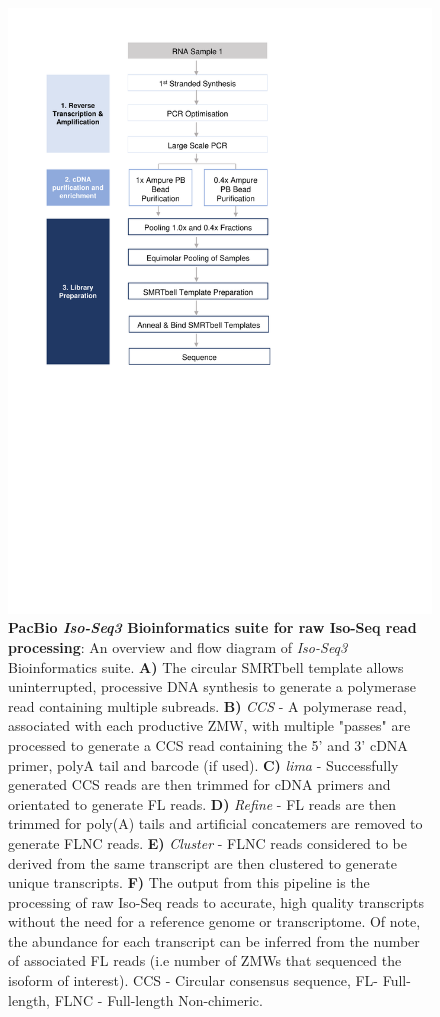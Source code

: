 \begin{figure}[htp]
	\centering
	\includegraphics[page=18,trim={0 8cm 0 0},clip,scale = 0.8]{Figures/ProjectDevelopment_Figures.pdf}
	\captionsetup{width=0.95\textwidth, singlelinecheck=off}
	\caption[PacBio \textit{Iso-Seq3} Bioinformatics suite for raw Iso-Seq read processing]%
	{\textbf{PacBio \textit{Iso-Seq3} Bioinformatics suite for raw Iso-Seq read processing}: An overview and flow diagram of \textit{Iso-Seq3} Bioinformatics suite. \textbf{A)} The circular SMRTbell template allows uninterrupted, processive DNA synthesis to generate a polymerase read containing multiple subreads. \textbf{B)} \textit{CCS} - A polymerase read, associated with each productive ZMW, with multiple "passes" are processed to generate a CCS read containing the 5' and 3' cDNA primer, polyA tail and barcode (if used). \textbf{C)} \textit{lima} - Successfully generated CCS reads are then trimmed for cDNA primers and orientated to generate FL reads. \textbf{D)} \textit{Refine} - FL reads are then trimmed for poly(A) tails and artificial concatemers are removed to generate FLNC reads. \textbf{E)} \textit{Cluster} - FLNC reads considered to be derived from the same transcript are then clustered to generate unique transcripts. \textbf{F)} The output from this pipeline is the processing of raw Iso-Seq reads to accurate, high quality transcripts without the need for a reference genome or transcriptome. Of note, the abundance for each transcript can be inferred from the number of associated FL reads (i.e number of ZMWs that sequenced the isoform of interest). CCS - Circular consensus sequence, FL- Full-length, FLNC - Full-length Non-chimeric.}

\end{figure}

